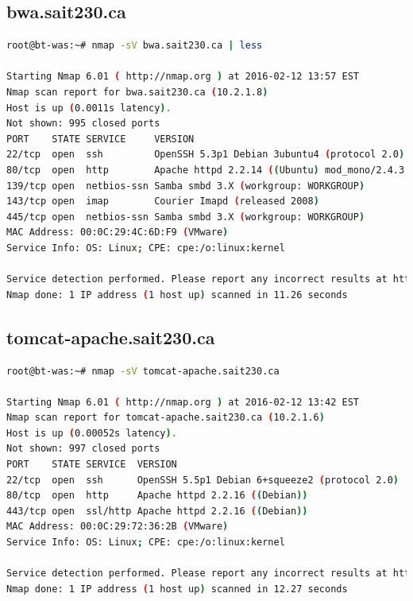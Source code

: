\documentclass{article}
\begin{document}
\newpage
\subsection{bwa.sait230.ca}

\begin{lstlisting}[language=bash]
root@bt-was:~# nmap -sV bwa.sait230.ca | less

Starting Nmap 6.01 ( http://nmap.org ) at 2016-02-12 13:57 EST
Nmap scan report for bwa.sait230.ca (10.2.1.8)
Host is up (0.0011s latency).
Not shown: 995 closed ports
PORT    STATE SERVICE     VERSION
22/tcp  open  ssh         OpenSSH 5.3p1 Debian 3ubuntu4 (protocol 2.0)
80/tcp  open  http        Apache httpd 2.2.14 ((Ubuntu) mod_mono/2.4.3 PHP/5.3.2-1ubuntu4.5 with Suhosin-Patch mod_python/3.3.1 Python/2.6.5 mod_perl/2.0.4 Perl/v5.10.1)
139/tcp open  netbios-ssn Samba smbd 3.X (workgroup: WORKGROUP)
143/tcp open  imap        Courier Imapd (released 2008)
445/tcp open  netbios-ssn Samba smbd 3.X (workgroup: WORKGROUP)
MAC Address: 00:0C:29:4C:6D:F9 (VMware)
Service Info: OS: Linux; CPE: cpe:/o:linux:kernel

Service detection performed. Please report any incorrect results at http://nmap.org/submit/ .
Nmap done: 1 IP address (1 host up) scanned in 11.26 seconds
\end{lstlisting}


\newpage
\subsection{tomcat-apache.sait230.ca}

\begin{lstlisting}[language=bash]
root@bt-was:~# nmap -sV tomcat-apache.sait230.ca

Starting Nmap 6.01 ( http://nmap.org ) at 2016-02-12 13:42 EST
Nmap scan report for tomcat-apache.sait230.ca (10.2.1.6)
Host is up (0.00052s latency).
Not shown: 997 closed ports
PORT    STATE SERVICE  VERSION
22/tcp  open  ssh      OpenSSH 5.5p1 Debian 6+squeeze2 (protocol 2.0)
80/tcp  open  http     Apache httpd 2.2.16 ((Debian))
443/tcp open  ssl/http Apache httpd 2.2.16 ((Debian))
MAC Address: 00:0C:29:72:36:2B (VMware)
Service Info: OS: Linux; CPE: cpe:/o:linux:kernel

Service detection performed. Please report any incorrect results at http://nmap.org/submit/ .
Nmap done: 1 IP address (1 host up) scanned in 12.27 seconds
\end{lstlisting}

\newpage
\end{document}
